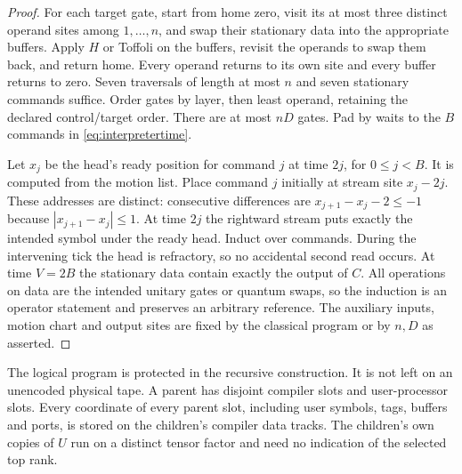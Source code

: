 \begin{proof}
For each target gate, start from home zero, visit its at most three distinct operand sites among $1,\ldots,n$, and swap their stationary data into the appropriate buffers. Apply $H$ or Toffoli on the buffers, revisit the operands to swap them back, and return home. Every operand returns to its own site and every buffer returns to zero. Seven traversals of length at most $n$ and seven stationary commands suffice. Order gates by layer, then least operand, retaining the declared control/target order. There are at most $nD$ gates. Pad by waits to the $B$ commands in \eqref{eq:interpretertime}.

Let $x_j$ be the head's ready position for command $j$ at time $2j$, for $0\le j<B$. It is computed from the motion list. Place command $j$ initially at stream site $x_j-2j$. These addresses are distinct: consecutive differences are $x_{j+1}-x_j-2\le-1$ because $|x_{j+1}-x_j|\le1$. At time $2j$ the rightward stream puts exactly the intended symbol under the ready head. Induct over commands. During the intervening tick the head is refractory, so no accidental second read occurs. At time $V=2B$ the stationary data contain exactly the output of $C$. All operations on data are the intended unitary gates or quantum swaps, so the induction is an operator statement and preserves an arbitrary reference. The auxiliary inputs, motion chart and output sites are fixed by the classical program or by $n,D$ as asserted.
\end{proof}

The logical program is protected in the recursive construction. It is not left on an unencoded physical tape. A parent has disjoint compiler slots and user-processor slots. Every coordinate of every parent slot, including user symbols, tags, buffers and ports, is stored on the children's compiler data tracks. The children's own copies of $U$ run on a distinct tensor factor and need no indication of the selected top rank.
